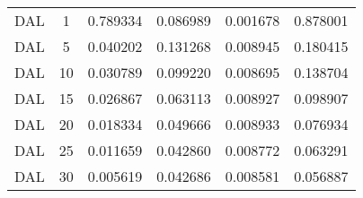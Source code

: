 \begin{table}
\begin{tabular}{lccccc}
DAL & 1 & 0.789334 & 0.086989 & 0.001678 & 0.878001 \\
DAL & 5 & 0.040202 & 0.131268 & 0.008945 & 0.180415 \\
DAL & 10 & 0.030789 & 0.099220 & 0.008695 & 0.138704 \\
DAL & 15 & 0.026867 & 0.063113 & 0.008927 & 0.098907 \\
DAL & 20 & 0.018334 & 0.049666 & 0.008933 & 0.076934 \\
DAL & 25 & 0.011659 & 0.042860 & 0.008772 & 0.063291 \\
DAL & 30 & 0.005619 & 0.042686 & 0.008581 & 0.056887 \\
\bottomrule
\end{tabular}
\end{table}
